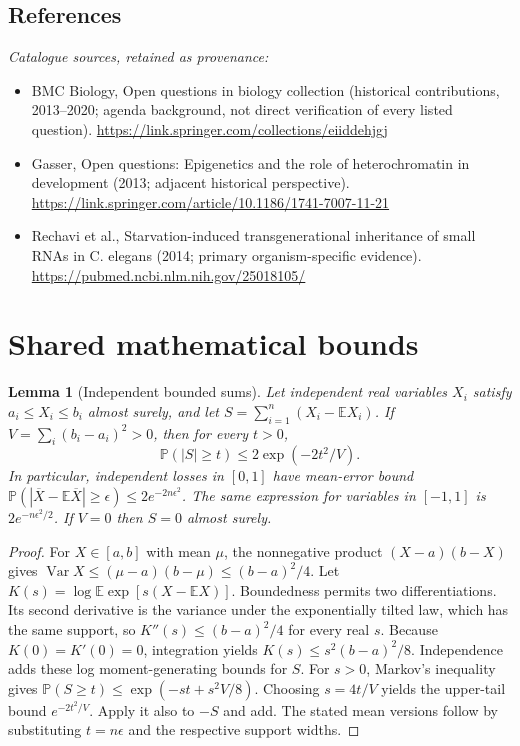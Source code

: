 \documentclass[11pt]{article}
\newcommand{\E}{\mathbb E}
\newcommand{\Prob}{\mathbb P}
\DeclareMathOperator{\Var}{Var}
\providecommand{\E}{\mathbb E}
\providecommand{\Prob}{\mathbb P}
\providecommand{\Var}{\operatorname{Var}}
\newtheorem{sharedlemma}{Lemma}[section]
\begin{document}
\subsection{References}
\noindent\emph{Catalogue sources, retained as provenance:}
\begin{itemize}
\item BMC Biology, Open questions in biology collection (historical contributions, 2013--2020; agenda background, not direct verification of every listed question). \url{https://link.springer.com/collections/eiiddehjgj}
\item Gasser, Open questions: Epigenetics and the role of heterochromatin in development (2013; adjacent historical perspective). \url{https://link.springer.com/article/10.1186/1741-7007-11-21}
\item Rechavi et al., Starvation-induced transgenerational inheritance of small RNAs in C. elegans (2014; primary organism-specific evidence). \url{https://pubmed.ncbi.nlm.nih.gov/25018105/}
\end{itemize}
\clearpage


\appendix
\section{Shared mathematical bounds}\label{app:bounds}
\begin{sharedlemma}[Independent bounded sums]\label{lem:bounded}
Let independent real variables $X_i$ satisfy $a_i\leq X_i\leq b_i$ almost surely,
and let $S=\sum_{i=1}^n(X_i-\E X_i)$. If
$V=\sum_i(b_i-a_i)^2>0$, then for every $t>0$,
\[
 \Prob(|S|\geq t)\leq 2\exp(-2t^2/V).
\]
In particular, independent losses in $[0,1]$ have mean-error bound
$\Prob(|\overline X-\E\overline X|\geq\epsilon)
\leq2e^{-2n\epsilon^2}$. The same expression for variables in $[-1,1]$
is $2e^{-n\epsilon^2/2}$. If $V=0$ then $S=0$ almost surely.
\end{sharedlemma}
\begin{proof}
For $X\in[a,b]$ with mean $\mu$, the nonnegative product
$(X-a)(b-X)$ gives
$\Var X\leq(\mu-a)(b-\mu)\leq(b-a)^2/4$.
Let $K(s)=\log\E\exp[s(X-\E X)]$.
Boundedness permits two differentiations. Its second derivative is the variance
under the exponentially tilted law, which has the same support, so
$K''(s)\leq(b-a)^2/4$ for every real $s$.
Because $K(0)=K'(0)=0$, integration yields
$K(s)\leq s^2(b-a)^2/8$.
Independence adds these log moment-generating bounds for $S$.
For $s>0$, Markov's inequality gives
$\Prob(S\geq t)\leq\exp(-st+s^2V/8)$.
Choosing $s=4t/V$ yields the upper-tail bound $e^{-2t^2/V}$.
Apply it also to $-S$ and add. The stated mean versions follow by substituting
$t=n\epsilon$ and the respective support widths.
\end{proof}
\end{document}
